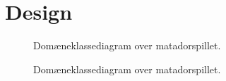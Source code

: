 \chapter{Design}\label{chap:Design}

\begin{figure}
\caption{Domæneklassediagram over matadorspillet.}\label{fig:tikzKlasseKontoPlayer17}
\centering

\end{figure}


\begin{figure}
\caption{Domæneklassediagram over matadorspillet.}\label{fig:tikzKlasseKontoPlayer17}
\centering

\end{figure}